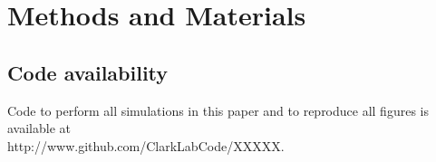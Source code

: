 \documentclass[9pt,lineno]{elife}
\begin{document}














\newpage


\section{Methods and Materials}

\subsection{Code availability}
Code to perform all simulations in this paper and to reproduce all figures is available at \\ http://www.github.com/ClarkLabCode/XXXXX.
\end{document}
